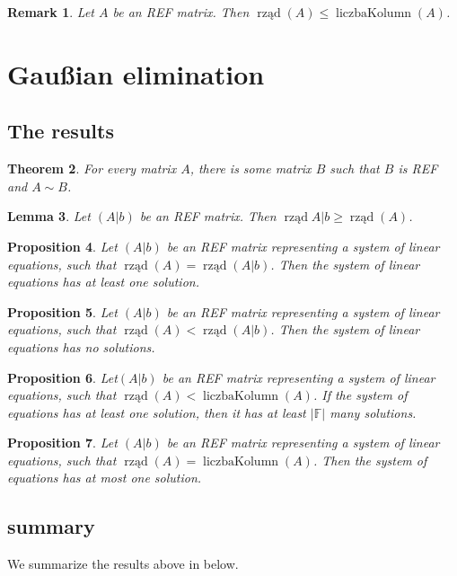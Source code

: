 \documentclass{article}
\def\rr{rank}
\def\cCtn{colCount}
\DeclareMathOperator{\rank}{\rr}
\DeclareMathOperator{\colctn}{\cCtn}
\newcommand{\Ab}{(A|b)}
\def\lemat{Lemma}
\def\prop{Proposition}
\def\thm{Theorem}
\newtheorem{lemma}{\lemat}[subsection]
\newtheorem{remark}[lemma]{Remark}
\newtheorem{theorem}[lemma]{\thm}
\newtheorem{proposition}[lemma]{\prop}
\theoremstyle{definition}
\def\lemat{Lemacik}
\def\prop{Propozycja}
\def\thm{Twerdzonko}
\def\rr{rząd}
\def\cCtn{liczbaKolumn}
\begin{document}
\begin{remark}\label{rem:0:0:6}
Let $A$ be an REF matrix. Then $\rank(A)\leq\colctn(A)$.
\end{remark}

\section{Gaußian elimination}
\subsection{The results}
\begin{theorem}
For every matrix $A$, there is some matrix $B$ such that $B$ is REF and $A\sim B$.
\end{theorem}

\begin{lemma}\label{lemma:1:1:2}
Let $(A|b)$ be an REF matrix. Then $\rank{A|b}\geq\rank(A)$.
\end{lemma}

\begin{proposition}\label{proposition:1:1:3}
Let $(A|b)$ be an REF matrix representing a system of linear equations, such that $\rank(A)=\rank{\Ab}$. Then the system of linear equations has at least one solution.
\end{proposition}

\begin{proposition}\label{proposition:1:1:4}
Let $\Ab$ be an REF matrix representing a system of linear equations, such that $\rank(A)<\rank{\Ab}$. Then the system of linear equations has no solutions.
\end{proposition}

\begin{proposition}\label{proposition:1:1:5}
Let$\Ab$ be an REF matrix representing a system of linear equations, such that $\rank(A)<\colctn(A)$. If the system of equations has at least one solution, then it has at least $|\mathbb{F}|$ many solutions.
\end{proposition}

\begin{proposition}\label{proposition:1:1:6}
Let $\Ab$ be an REF matrix representing a system of linear equations, such that $\rank(A)=\colctn(A)$. Then the system of equations has at most one solution.
\end{proposition}

\subsection{summary}\label{summ}
We summarize the results above in  below.
\end{document}
